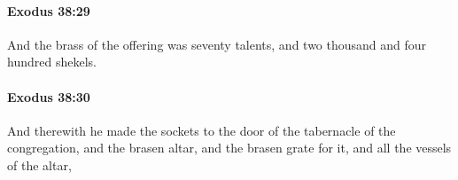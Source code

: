 		\paragraph{Exodus 38:29} %
			\label{EXODUS-38-29}

			And the brass of the offering was seventy talents, and two thousand and four hundred shekels.


		\paragraph{Exodus 38:30} %
			\label{EXODUS-38-30}

			And therewith he made the sockets to the door of the tabernacle of the congregation, and the brasen altar, and the brasen grate for it, and all the vessels of the altar,


